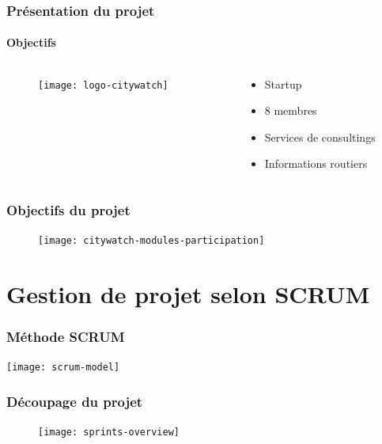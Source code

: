 \documentclass{beamer}
\begin{document}
\begin{frame}
    \frametitle{Présentation du projet}
    \framesubtitle{Objectifs}
    \begin{columns}
        \begin{column}{0.5\textwidth}
            \begin{figure}
                \texttt{[image: logo-citywatch]}
            \end{figure}
        \end{column}
        \begin{column}{0.5\textwidth}
            \begin{itemize}
                \item Startup
                \item 8 membres
                \item Services de consultings
                \item Informations routiers
            \end{itemize}
        \end{column}
    \end{columns}
\end{frame}

\begin{frame}
    \frametitle{Objectifs du projet}
    \begin{figure}
        \centering
        \texttt{[image: citywatch-modules-participation]}
    \end{figure}
\end{frame}

\section{Gestion de projet selon SCRUM}


\begin{frame}
    \frametitle{Méthode SCRUM}
    \centering
    \texttt{[image: scrum-model]}
\end{frame}

\begin{frame}
\frametitle{Découpage du projet}
\begin{figure}
    \texttt{[image: sprints-overview]}
\end{figure}
\end{frame}
\end{document}
